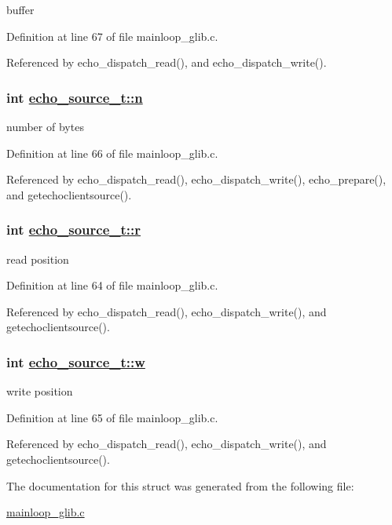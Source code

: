buffer 



Definition at line 67 of file mainloop\_\-glib.c.

Referenced by echo\_\-dispatch\_\-read(), and echo\_\-dispatch\_\-write().\hypertarget{structecho__source__t_o2}{
\subsubsection[n]{\setlength{\rightskip}{0pt plus 5cm}int \hyperlink{structecho__source__t_o2}{echo\_\-source\_\-t::n}}}
\label{structecho__source__t_o2}


number of bytes 



Definition at line 66 of file mainloop\_\-glib.c.

Referenced by echo\_\-dispatch\_\-read(), echo\_\-dispatch\_\-write(), echo\_\-prepare(), and getechoclientsource().\hypertarget{structecho__source__t_o0}{
\subsubsection[r]{\setlength{\rightskip}{0pt plus 5cm}int \hyperlink{structecho__source__t_o0}{echo\_\-source\_\-t::r}}}
\label{structecho__source__t_o0}


read position 



Definition at line 64 of file mainloop\_\-glib.c.

Referenced by echo\_\-dispatch\_\-read(), echo\_\-dispatch\_\-write(), and getechoclientsource().\hypertarget{structecho__source__t_o1}{
\subsubsection[w]{\setlength{\rightskip}{0pt plus 5cm}int \hyperlink{structecho__source__t_o1}{echo\_\-source\_\-t::w}}}
\label{structecho__source__t_o1}


write position 



Definition at line 65 of file mainloop\_\-glib.c.

Referenced by echo\_\-dispatch\_\-read(), echo\_\-dispatch\_\-write(), and getechoclientsource().

The documentation for this struct was generated from the following file:\begin{CompactItemize}
\item 
\hyperlink{mainloop__glib_8c}{mainloop\_\-glib.c}\end{CompactItemize}
